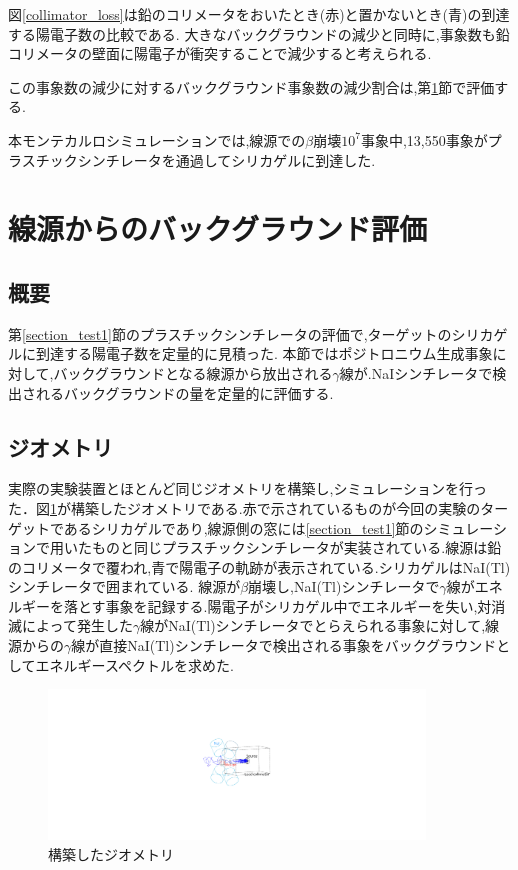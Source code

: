 図\ref{collimator_loss}は鉛のコリメータをおいたとき(赤)と置かないとき(青)の到達する陽電子数の比較である.
大きなバックグラウンドの減少と同時に,事象数も鉛コリメータの壁面に陽電子が衝突することで減少すると考えられる.

この事象数の減少に対するバックグラウンド事象数の減少割合は,第\ref{section_test2}節で評価する.

本モンテカルロシミュレーションでは,線源での$\beta$崩壊$10^7$事象中,13,550事象がプラスチックシンチレータを通過してシリカゲルに到達した.



\section{線源からのバックグラウンド評価}
\label{section_test2}

\subsection{概要}
第\ref{section_test1}節のプラスチックシンチレータの評価で,ターゲットのシリカゲルに到達する陽電子数を定量的に見積った.
本節ではポジトロニウム生成事象に対して,バックグラウンドとなる線源から放出される$\gamma$線が.NaIシンチレータで検出されるバックグラウンドの量を定量的に評価する.


\subsection{ジオメトリ}
実際の実験装置とほとんど同じジオメトリを構築し,シミュレーションを行った．図\ref{test2_geometry}が構築したジオメトリである.赤で示されているものが今回の実験のターゲットであるシリカゲルであり,線源側の窓には\ref{section_test1}節のシミュレーションで用いたものと同じプラスチックシンチレータが実装されている.線源は鉛のコリメータで覆われ,青で陽電子の軌跡が表示されている.シリカゲルはNaI(Tl)シンチレータで囲まれている.
線源が$\beta$崩壊し,NaI(Tl)シンチレータで$\gamma$線がエネルギーを落とす事象を記録する.陽電子がシリカゲル中でエネルギーを失い,対消滅によって発生した$\gamma$線がNaI(Tl)シンチレータでとらえられる事象に対して,線源からの$\gamma$線が直接NaI(Tl)シンチレータで検出される事象をバックグラウンドとしてエネルギースペクトルを求めた.

\begin{figure}[htbp]
	\centering
		\includegraphics[width=10cm]{img/test2_geometry.pdf}
	\caption{構築したジオメトリ}
	\label{test2_geometry}
\end{figure}


